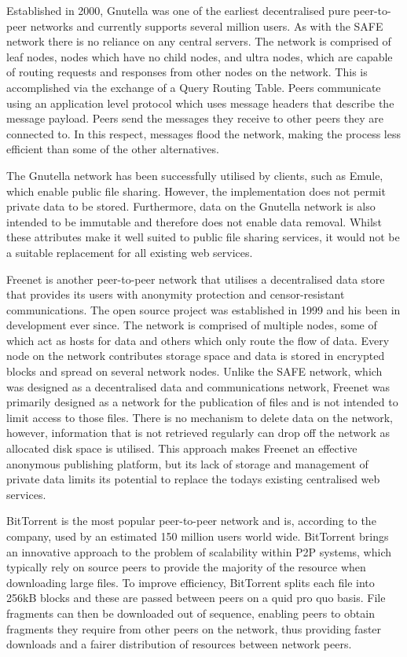 \documentclass[twocolumn,english]{article}
\begin{document}
Established in 2000, Gnutella was one of the earliest decentralised pure peer-to-peer networks and currently supports several million users.  As with the SAFE network there is no
reliance on any central servers. The network is comprised of leaf nodes, nodes which have no child nodes, and ultra nodes, which are capable of routing requests and responses
from other nodes on the network.  This is accomplished via the exchange of a Query Routing Table. Peers communicate using an application level protocol which uses message headers that describe the message payload.  Peers send the messages they receive to other peers they are connected to. In this respect, messages flood the network, making the process less efficient than some of the other alternatives.

The Gnutella network has been successfully utilised by clients, such as Emule, which enable public file sharing. However, the implementation does not permit private data to be stored. 
Furthermore, data on the Gnutella network is also intended to be immutable and therefore does not enable data removal. Whilst these attributes make it well suited to public file
sharing services, it would not be a suitable replacement for all existing web services.

Freenet is another peer-to-peer network that utilises a decentralised data store that provides its users with anonymity protection and censor-resistant communications. The open source
project was established in 1999 and his been in development ever since. The network is comprised of multiple nodes, some of which act as hosts for data and others which only route the 
flow of data. Every node on the network contributes storage space and data is stored in encrypted blocks and spread on several network nodes. 
Unlike the SAFE network, which was designed as a decentralised data and communications network, Freenet was primarily designed as a network for the publication of files and is not 
intended to limit access to those files. There is no mechanism to delete data on the network, however, information that is not retrieved regularly can drop off the network as allocated disk 
space is utilised. This approach makes Freenet an effective anonymous publishing platform, but its lack of storage and management of private data limits its potential to replace the todays
existing centralised web services. 

BitTorrent is the most popular peer-to-peer network and is, according to the company, used by an estimated 150 million users world wide.  BitTorrent brings an innovative 
approach to the problem of scalability within P2P systems, which typically rely on source peers to provide the majority of the resource when downloading large files. To improve
efficiency, BitTorrent splits each file into 256kB blocks and these are passed between peers on a quid pro quo basis. File fragments can then be downloaded out of sequence, enabling 
peers to obtain fragments they require from other peers on the network, thus providing faster downloads and a fairer distribution of resources between network peers.
\end{document}
